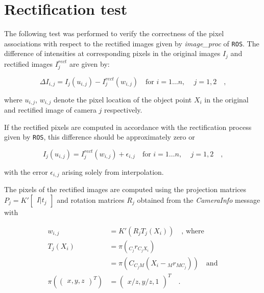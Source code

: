 \section{Rectification test}

The following test was performed to verify the correctness of the pixel
associations with respect to the rectified images given by \textit{image\_proc}
of \texttt{ROS}.
The difference of intensities at corresponding pixels in the original images $I_{j}$ and rectified images $I_{j}^{rect}$ are given by:

\begin{equation}
  \Delta I_{i,j} = I_j(u_{i,j}) - I_j^{rect}(w_{i,j}) 
  \hspace{1em} \text{for } i = 1 \ldots n \text{, } \hspace{1em} j = 1,2
  \hspace{1em}\text{,}
  \label{eqn:rect/I_def}
\end{equation}

where $u_{i,j}$, $w_{i,j}$ denote the pixel location of the object point $X_i$ in the
original and rectified image of camera $j$ respectively.

If the rectified pixels are computed in accordance with the rectification
process given by \texttt{ROS}, this difference should be
approximately zero or

\begin{equation}
  I_j(u_{i,j}) = I_j^{rect}(w_{i,j}) + \epsilon_{i,j} 
  \hspace{1em} \text{for } i = 1 \ldots n \text{, } \hspace{1em} j = 1,2
  \hspace{1em}\text{,}
  \label{eqn:rect/diffI_eq}
\end{equation}

with the error $\epsilon_{i,j}$ arising solely from interpolation.

The pixels of the rectified images are computed using the projection matrices
$P_{j} = K' \begin{bmatrix} I | t_j \end{bmatrix}$ and rotation matrices $R_j$ 
obtained from the \textit{CameraInfo} message with \cite{WikiCameraInfo}

\begin{align}
  w_{i,j} &= K'(R_j T_j(X_i)) \hspace{1em} \text{, where} \\
  T_j(X_i) &= \pi(_{C_j}r_{C_jX_i}) \\
           &= \pi(C_{C_j M} (X_i - {_M}r_{MC_j})) \hspace{1em} \text{and} \\
  \pi(\begin{pmatrix} x, y, z \end{pmatrix}^T) &= 
  \begin{pmatrix} x/z, y/z, 1 \end{pmatrix}^T 
  \hspace{1em}\text{.}
  \label{eqn:rect/utilde_def}
\end{align}

